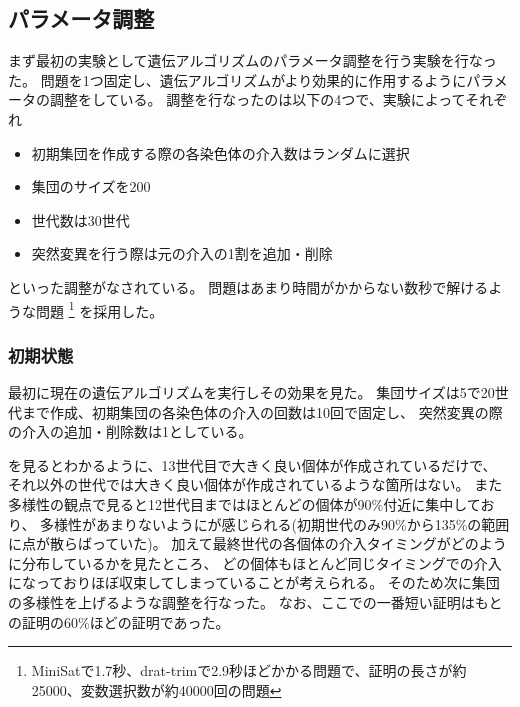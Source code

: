 \subsection{パラメータ調整}



まず最初の実験として遺伝アルゴリズムのパラメータ調整を行う実験を行なった。
問題を1つ固定し、遺伝アルゴリズムがより効果的に作用するようにパラメータの調整をしている。
調整を行なったのは以下の4つで、実験によってそれぞれ
\begin{itemize}
    \item 初期集団を作成する際の各染色体の介入数はランダムに選択
    \item 集団のサイズを200
    \item 世代数は30世代
    \item 突然変異を行う際は元の介入の1割を追加・削除
\end{itemize}
といった調整がなされている。
問題はあまり時間がかからない数秒で解けるような問題
\footnote{MiniSatで1.7秒、drat-trimで2.9秒ほどかかる問題で、証明の長さが約25000、変数選択数が約40000回の問題}
を採用した。




\subsubsection{初期状態}

最初に現在の遺伝アルゴリズムを実行しその効果を見た。
集団サイズは5で20世代まで作成、初期集団の各染色体の介入の回数は10回で固定し、
突然変異の際の介入の追加・削除数は1としている。


を見るとわかるように、13世代目で大きく良い個体が作成されているだけで、
それ以外の世代では大きく良い個体が作成されているような箇所はない。
また多様性の観点で見ると12世代目まではほとんどの個体が90\%付近に集中しており、
多様性があまりないようにが感じられる(初期世代のみ90\%から135\%の範囲に点が散らばっていた)。
加えて最終世代の各個体の介入タイミングがどのように分布しているかを見たところ、
どの個体もほとんど同じタイミングでの介入になっておりほぼ収束してしまっていることが考えられる。
そのため次に集団の多様性を上げるような調整を行なった。
なお、ここでの一番短い証明はもとの証明の60\%ほどの証明であった。



